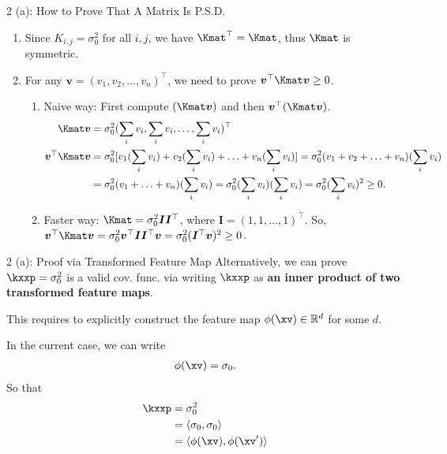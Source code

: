 \documentclass[aspectratio=169]{beamer}
\newcommand{\xvp}{\xv^\prime}
\newcommand{\Imat}{\bm{I}}
\newcommand{\Kij}{K_{i,j}}
\newcommand{\vv}{\bm{v}}
\begin{document}
\begin{frame}{2 (a): How to Prove That A Matrix Is P.S.D.}
\small
	\begin{enumerate}
		\item Since $\Kij = \sigma_0^2$ for all $i,j$, we have $\Kmat^\top = \Kmat$, thus $\Kmat$ is symmetric.
		\item For any $\vv = (v_1, v_2, \ldots, v_n)^\top$, we need to prove $ \vv^\top \Kmat \vv \geq 0$.
		\begin{enumerate}
			\item Naive way: First compute $(\Kmat \vv)$ and then $\vv^\top (\Kmat \vv)$. 
			\begin{align*}
				\Kmat \vv &= \sigma_0^2(\sum_i v_i, \sum_i v_i, \ldots, \sum_i v_i )^\top \\
				\vv^\top \Kmat \vv &= \sigma_0^2 [v_1 (\sum_i v_i) + v_2 (\sum_i v_i) + \ldots + v_n (\sum_i v_i)] = \sigma_0^2(v_1 + v_2 + \ldots + v_n) (\sum_i v_i) \\
				&= \sigma_0^2 (v_1 + \ldots + v_n) (\sum_i v_i) = \sigma_0^2 (\sum_i v_i) (\sum_i v_i) = \sigma_0^2 (\sum_i v_i)^2 \geq 0.
			\end{align*}
			\item Faster way: $\Kmat = \sigma_0^2\Imat \Imat^\top$, where $\Imat = (1, 1, \ldots, 1)^\top$. So, $\vv^\top \Kmat \vv = \sigma_0^2 \vv^\top \Imat \Imat^\top \vv = \sigma_0^2 (\Imat^\top \vv)^2 \geq 0$.
		\end{enumerate}
	\end{enumerate}
\end{frame}

\begin{frame}{2 (a): Proof via Transformed Feature Map}
	Alternatively, we can prove $\kxxp = \sigma_0^2$ is a valid cov. func. via writing $\kxxp$ as \textbf{an inner product of two transformed feature maps}.
	
	This requires to explicitly construct the feature map $\phi(\xv) \in \mathbb{R}^d$ for some $d$.
	
	In the current case, we can write 
	\begin{align*}
		\phi(\xv) = \sigma_0.
	\end{align*}
	So that 
	\begin{align*}
		\kxxp & = \sigma_0^2 \\
		&= \langle \sigma_0, \sigma_0 \rangle \\
		&= \langle \phi(\xv), \phi(\xvp) \rangle  \\
	\end{align*}
\end{frame}
\end{document}
